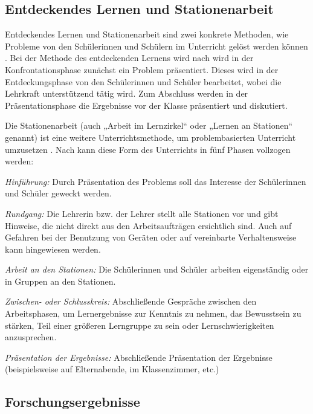 \documentclass[man,12pt,a4paper]{apa6}
\begin{document}
\subsection{Entdeckendes Lernen und Stationenarbeit}

Entdeckendes Lernen und Stationenarbeit sind zwei konkrete Methoden, wie Probleme von den Schülerinnen und Schülern im Unterricht gelöst werden können \parencite{kunter2013}. Bei der Methode des entdeckenden Lernens wird nach \textcite{hameyer2008} wird in der Konfrontationsphase zunächst ein Problem präsentiert. Dieses wird in der Entdeckungsphase von den Schülerinnen und Schüler bearbeitet, wobei die Lehrkraft unterstützend tätig wird. Zum Abschluss werden in der Präsentationsphase die Ergebnisse vor der Klasse präsentiert und diskutiert.

Die Stationenarbeit (auch „Arbeit im Lernzirkel“ oder „Lernen an Stationen“ genannt) ist eine weitere Unterrichtsmethode, um problembasierten Unterricht umzusetzen \parencite{hegele2008}. Nach \textcite{hegele2008} kann diese Form des Unterrichts in fünf Phasen vollzogen werden:

\begin{APAenumerate}
  \item \emph{Hinführung:} Durch Präsentation des Problems soll das Interesse der Schülerinnen und Schüler geweckt werden.
  \item \emph{Rundgang:} Die Lehrerin bzw. der Lehrer stellt alle Stationen vor und gibt Hinweise, die nicht direkt aus den Arbeitsaufträgen ersichtlich sind. Auch auf Gefahren bei der Benutzung von Geräten oder auf vereinbarte Verhaltensweise kann hingewiesen werden.
  \item \emph{Arbeit an den Stationen:} Die Schülerinnen und Schüler arbeiten eigenständig oder in Gruppen an den Stationen.
  \item \emph{Zwischen- oder Schlusskreis:} Abschließende Gespräche zwischen den Arbeitsphasen, um Lernergebnisse zur Kenntnis zu nehmen, das Bewusstsein zu stärken, Teil einer größeren Lerngruppe zu sein oder Lernschwierigkeiten anzusprechen.
  \item \emph{Präsentation der Ergebnisse:} Abschließende Präsentation der Ergebnisse (beispielsweise auf Elternabende, im Klassenzimmer, etc.)
\end{APAenumerate}

\subsection{Forschungsergebnisse}
\end{document}
